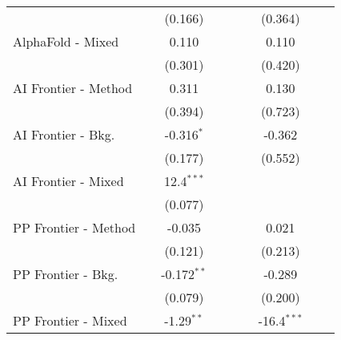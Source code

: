 \begin{tabular}{lcccccccc}
                                                  &               & (0.166)       &        &        &               & (0.364)       &       &   \\   
   AlphaFold - Mixed                              &               & 0.110         &        &        &               & 0.110         &       &   \\   
                                                  &               & (0.301)       &        &        &               & (0.420)       &       &   \\   
   AI Frontier - Method                           &               & 0.311         &        &        &               & 0.130         &       &   \\   
                                                  &               & (0.394)       &        &        &               & (0.723)       &       &   \\   
   AI Frontier - Bkg.                             &               & -0.316$^{*}$  &        &        &               & -0.362        &       &   \\   
                                                  &               & (0.177)       &        &        &               & (0.552)       &       &   \\   
   AI Frontier - Mixed                            &               & 12.4$^{***}$  &        &        &               &               &       &   \\   
                                                  &               & (0.077)       &        &        &               &               &       &   \\   
   PP Frontier - Method                           &               & -0.035        &        &        &               & 0.021         &       &   \\   
                                                  &               & (0.121)       &        &        &               & (0.213)       &       &   \\   
   PP Frontier - Bkg.                             &               & -0.172$^{**}$ &        &        &               & -0.289        &       &   \\   
                                                  &               & (0.079)       &        &        &               & (0.200)       &       &   \\   
   PP Frontier - Mixed                            &               & -1.29$^{**}$  &        &        &               & -16.4$^{***}$ &       &   \\   

\end{tabular}
